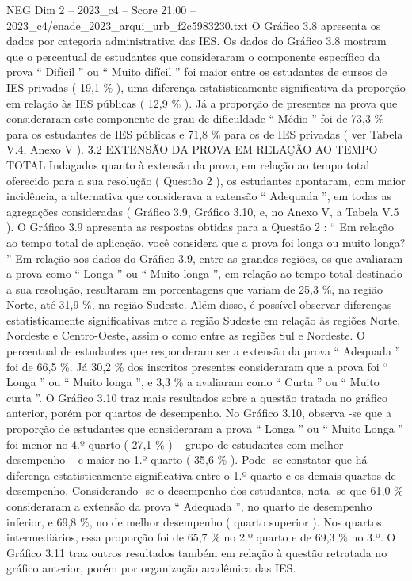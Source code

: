 \begin{textsample}{NEG Dim 2 – 2023\_c4 – Score 21.00 – 2023\_c4/enade\_2023\_arqui\_urb\_f2c5983230.txt}
O Gráfico 3.8 apresenta os dados por categoria administrativa das IES.
Os dados do Gráfico 3.8 mostram que o percentual de estudantes que consideraram o componente específico da prova “ Difícil ” ou “ Muito difícil ” foi maior entre os estudantes de cursos de IES privadas ( 19,1 \% ), uma diferença estatisticamente significativa da proporção em relação às IES públicas ( 12,9 \% ).
Já a proporção de presentes na prova que consideraram este componente de grau de dificuldade “ Médio ” foi de 73,3 \% para os estudantes de IES públicas e 71,8 \% para os de IES privadas ( ver Tabela V.4, Anexo V ). 3.2 EXTENSÃO DA PROVA EM RELAÇÃO AO TEMPO TOTAL Indagados quanto à extensão da prova, em relação ao tempo total oferecido para a sua resolução ( Questão 2 ), os estudantes apontaram, com maior incidência, a alternativa que considerava a extensão “ Adequada ”, em todas as agregações consideradas ( Gráfico 3.9, Gráfico 3.10, e, no Anexo V, a Tabela V.5 ).
O Gráfico 3.9 apresenta as respostas obtidas para a Questão 2 : “ Em relação ao tempo total de aplicação, você considera que a prova foi longa ou muito longa? ” Em relação aos dados do Gráfico 3.9, entre as grandes regiões, os que avaliaram a prova como “ Longa ” ou “ Muito longa ”, em relação ao tempo total destinado a sua resolução, resultaram em porcentagens que variam de 25,3 \%, na região Norte, até 31,9 \%, na região Sudeste.
Além disso, é possível observar diferenças estatisticamente significativas entre a região Sudeste em relação às regiões Norte, Nordeste e Centro-Oeste, assim o como entre as regiões Sul e Nordeste.
O percentual de estudantes que responderam ser a extensão da prova “ Adequada ” foi de 66,5 \%.
Já 30,2 \% dos inscritos presentes consideraram que a prova foi “ Longa ” ou “ Muito longa ”, e 3,3 \% a avaliaram como “ Curta ” ou “ Muito curta ”.
O Gráfico 3.10 traz mais resultados sobre a questão tratada no gráfico anterior, porém por quartos de desempenho.
No Gráfico 3.10, observa -se que a proporção de estudantes que consideraram a prova “ Longa ” ou “ Muito Longa ” foi menor no 4.º quarto ( 27,1 \% ) – grupo de estudantes com melhor desempenho – e maior no 1.º quarto ( 35,6 \% ).
Pode -se constatar que há diferença estatisticamente significativa entre o 1.º quarto e os demais quartos de desempenho.
Considerando -se o desempenho dos estudantes, nota -se que 61,0 \% consideraram a extensão da prova “ Adequada ”, no quarto de desempenho inferior, e 69,8 \%, no de melhor desempenho ( quarto superior ).
Nos quartos intermediários, essa proporção foi de 65,7 \% no 2.º quarto e de 69,3 \% no 3.º.
O Gráfico 3.11 traz outros resultados também em relação à questão retratada no gráfico anterior, porém por organização acadêmica das IES.

\end{textsample}
